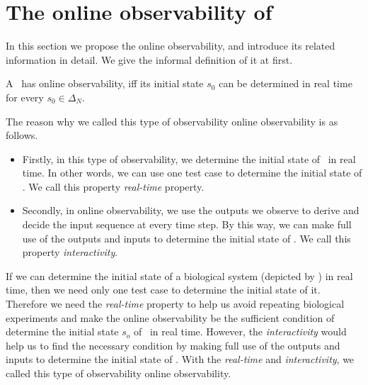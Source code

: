 \section{The online observability of \BCNs}
\label{sec:online}
In this section we propose the online observability, and introduce its related information in detail. We give the informal definition of it at first. 

	A \BCN\ has online observability, iff its initial state $s_0$ can be determined in real time for every $s_0 \in \Delta_N$. %

The reason why we called this type of observability online observability is as follows.
\begin{itemize}
  \item Firstly, in this type of observability, we determine the initial state of \BCNs\ in real time. In other words, we can use one test case to determine the initial state of \BCNs. We call this property {\em real-time} property.%
  \item  Secondly, in online observability, we use the outputs we observe to derive and decide the input sequence at every time step. By this way, we can make full use of the outputs and inputs to determine the initial state of \BCNs. We call this property {\em interactivity}.
\end{itemize} 

If we can determine the initial state of a biological system (depicted by \BCN) in real time, then we need only one test case to determine the initial state of it. Therefore we need the {\em real-time} property to help us avoid repeating biological experiments and make the online observability be the sufficient condition of determine the initial state $s_o$ of \BCNs\ in real time. However, the {\em interactivity} would help us to find the necessary condition by making full use of the outputs and inputs to determine the initial state of \BCNs. With the  {\em real-time} and {\em interactivity}, we called this type of observability online observability.

